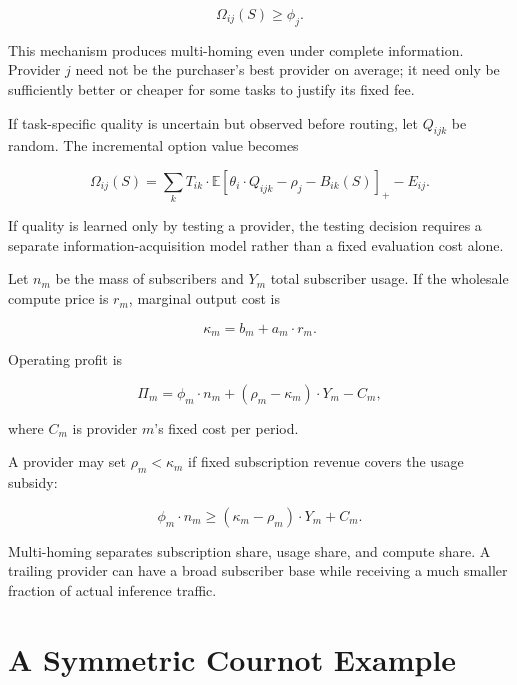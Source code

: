 \documentclass[11pt]{article}
\begin{document}
\begin{equation}\Omega_{ij}(S)\geq\phi_j.\end{equation}

This mechanism produces multi-homing even under complete information. Provider $j$ need not be the purchaser's best provider on average; it need only be sufficiently better or cheaper for some tasks to justify its fixed fee.

If task-specific quality is uncertain but observed before routing, let $Q_{ijk}$ be random. The incremental option value becomes

\begin{equation}\Omega_{ij}(S)=\sum_k T_{ik}\cdot\mathbb E\left[\theta_i\cdot Q_{ijk}-\rho_j-B_{ik}(S)\right]_+-E_{ij}.\end{equation}

If quality is learned only by testing a provider, the testing decision requires a separate information-acquisition model rather than a fixed evaluation cost alone.

Let $n_m$ be the mass of subscribers and $Y_m$ total subscriber usage. If the wholesale compute price is $r_m$, marginal output cost is

\begin{equation}\kappa_m=b_m+a_m\cdot r_m.\end{equation}

Operating profit is

\begin{equation}\Pi_m=\phi_m\cdot n_m+\left(\rho_m-\kappa_m\right)\cdot Y_m-C_m,\end{equation}

where $C_m$ is provider $m$'s fixed cost per period.

A provider may set $\rho_m<\kappa_m$ if fixed subscription revenue covers the usage subsidy:

\begin{equation}\phi_m\cdot n_m\geq\left(\kappa_m-\rho_m\right)\cdot Y_m+C_m.\end{equation}

Multi-homing separates subscription share, usage share, and compute share. A trailing provider can have a broad subscriber base while receiving a much smaller fraction of actual inference traffic.

\section{A Symmetric Cournot Example}
\label{app:cournot}
\end{document}
